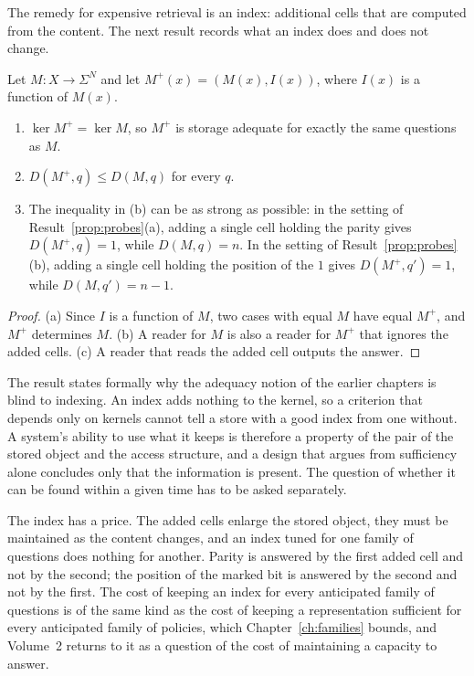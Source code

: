 The remedy for expensive retrieval is an index: additional cells that are computed from the content. The next result records what an index does and does not change.

\begin{newresult}\label{prop:index}
Let $M:X\to\Sigma^{N}$ and let $M^{+}(x)=(M(x),I(x))$, where $I(x)$ is a function of $M(x)$.
\begin{enumerate}[nosep,label=(\alph*)]
  \item $\ker M^{+}=\ker M$, so $M^{+}$ is storage adequate for exactly the same questions as $M$.
  \item $D(M^{+},q)\le D(M,q)$ for every $q$.
  \item The inequality in (b) can be as strong as possible: in the setting of Result~\ref{prop:probes}(a), adding a single cell holding the parity gives $D(M^{+},q)=1$, while $D(M,q)=n$. In the setting of Result~\ref{prop:probes}(b), adding a single cell holding the position of the $1$ gives $D(M^{+},q')=1$, while $D(M,q')=n-1$.
\end{enumerate}
\end{newresult}
\begin{proof}
(a) Since $I$ is a function of $M$, two cases with equal $M$ have equal $M^{+}$, and $M^{+}$ determines $M$. (b) A reader for $M$ is also a reader for $M^{+}$ that ignores the added cells. (c) A reader that reads the added cell outputs the answer.
\end{proof}

The result states formally why the adequacy notion of the earlier chapters is blind to indexing. An index adds nothing to the kernel, so a criterion that depends only on kernels cannot tell a store with a good index from one without. A system's ability to use what it keeps is therefore a property of the pair of the stored object and the access structure, and a design that argues from sufficiency alone concludes only that the information is present. The question of whether it can be found within a given time has to be asked separately.

The index has a price. The added cells enlarge the stored object, they must be maintained as the content changes, and an index tuned for one family of questions does nothing for another. Parity is answered by the first added cell and not by the second; the position of the marked bit is answered by the second and not by the first. The cost of keeping an index for every anticipated family of questions is of the same kind as the cost of keeping a representation sufficient for every anticipated family of policies, which Chapter~\ref{ch:families} bounds, and Volume~2 returns to it as a question of the cost of maintaining a capacity to answer.


